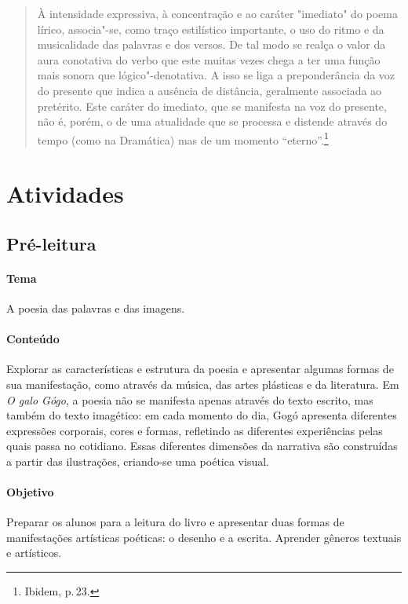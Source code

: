\documentclass[11pt]{extarticle}
\begin{document}
\begin{quote}
À intensidade expressiva, à concentração e ao caráter "imediato" do poema lírico, associa"-se, como traço estilístico importante, o uso do ritmo e da musicalidade das palavras e dos versos. De tal modo se realça o valor da aura conotativa do verbo que este muitas vezes chega a ter uma função mais sonora que lógico"-denotativa. A isso se liga a preponderância da voz do presente que indica a ausência de distância, geralmente associada ao pretérito. Este caráter do imediato, que se manifesta na voz do presente, não é, porém, o de uma atualidade que se processa e distende através do tempo (como na Dramática) mas de um momento ``eterno''.\footnote{Ibidem, p.\,23.}
\end{quote}



\section{Atividades}

\subsection{Pré-leitura}

\paragraph{Tema} A poesia das palavras e das imagens.

\paragraph{Conteúdo} Explorar as características e estrutura da poesia e apresentar algumas formas de sua manifestação, como através da música, das artes plásticas e da literatura. Em \textit{O galo Gógo}, a poesia não se manifesta apenas através do texto escrito, mas também do texto imagético: em cada momento do dia, Gogó apresenta diferentes expressões corporais, cores e formas, refletindo as diferentes experiências pelas quais passa no cotidiano. Essas diferentes dimensões da narrativa são construídas a partir das ilustrações, criando-se uma poética visual.


\paragraph{Objetivo} Preparar os alunos para a leitura do livro e apresentar duas formas de manifestações artísticas poéticas: o desenho e a escrita. Aprender gêneros textuais e artísticos.
\end{document}
